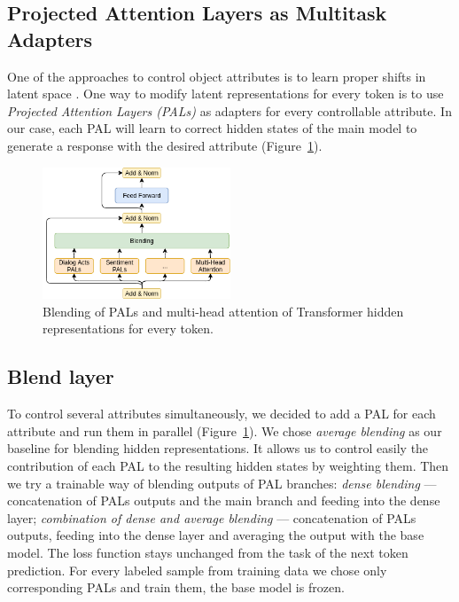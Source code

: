 \documentclass[11pt]{article}
\begin{document}
\subsection{Projected Attention Layers as Multitask Adapters}
One of the approaches to control object attributes is to learn proper shifts in latent space \cite{hu2021controllable}. One way to modify latent representations for every token is to use \textit{Projected Attention Layers (PALs)} \cite{stickland2019bert} as adapters for every controllable attribute. In our case, each PAL will learn to correct hidden states of the main model to generate a response with the desired attribute (Figure~\ref{adding_pals_dialogpt}).
\begin{figure}[ht!]
    \centering
    \includegraphics[width=0.5\textwidth]{img/pals_model.png}
    \caption{Blending of PALs and multi-head attention of Transformer hidden representations for every token.}
    \label{adding_pals_dialogpt}
\end{figure}

\subsection{Blend layer}
To control several attributes simultaneously, we decided to add a PAL for each attribute and run them in parallel (Figure~\ref{adding_pals_dialogpt}). 
We chose \textit{average blending} as our baseline for blending hidden representations. It allows us to control easily the contribution of each PAL to the resulting hidden states by weighting them. Then we try a trainable way of blending outputs of PAL branches: \textit{dense blending} --- concatenation of PALs outputs and the main branch and feeding into the dense layer; \textit{combination of dense and average blending} --- concatenation of PALs outputs, feeding into the dense layer and averaging the output with the base model.
The loss function stays unchanged from the task of the next token prediction. For every labeled sample from training data we chose only corresponding PALs and train them, the base model is frozen. %
\end{document}
